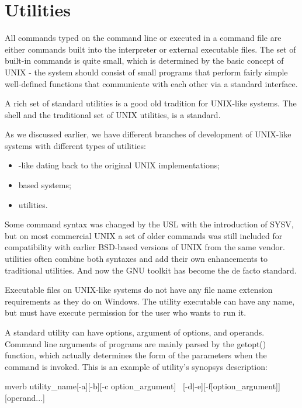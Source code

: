 \section*{Utilities}

All commands typed on the command line or executed in a command file are
either commands built into the interpreter or external executable files.
The set of built-in commands is quite small, which is determined by the
basic concept of UNIX - the system should consist of small programs that
perform fairly simple well-defined functions that communicate with each
other via a standard interface.

A rich set of standard utilities is a good old tradition for UNIX-like
systems. The shell and the traditional set of UNIX utilities,
is a  standard.

As we discussed earlier, we have different branches of development of
UNIX-like systems with different types of utilities:
\begin{itemize}
\item {}-like dating back to the original UNIX implementations;
\item {} based systems;
\item {} utilities.
\end{itemize}

Some command syntax was changed by the USL with the introduction of SYSV,
but on most commercial UNIX a set of older commands was still included
for compatibility with earlier BSD-based versions of UNIX from the same vendor.
 utilities often combine both syntaxes and add their own
enhancements to traditional utilities. And now the GNU toolkit has become
the de facto standard.

Executable files on UNIX-like systems do not have any file name extension
requirements as they do on Windows. The utility executable can have any name,
but must have execute permission for the user who wants to run it.

A standard utility can have options, argument of options, and operands.
Command line arguments of programs are mainly parsed by the getopt()
function, which actually determines the form of the parameters when
the command is invoked. This is an example of utility's synopsys description:

\begin{code}{mverb}
utility_name[-a][-b][-c option_argument] \
                          [-d|-e][-f[option_argument]][operand...]
\end{code}

